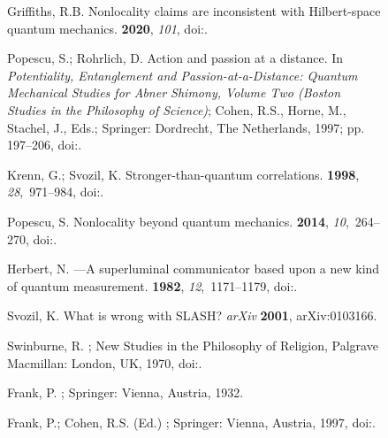\documentclass[entropy,article,accept,oneauthor,pdftex]{Definitions/mdpi}
\begin{document}
\begin{figure}[H]
\begin{thebibliography}{999}
Griffiths, R.B.
\newblock Nonlocality claims are inconsistent with {H}ilbert-space quantum
  mechanics.
 {\bf 2020}, {\em 101}, doi:{\href{https://doi.org/10.1103/physreva.101.022117}{}}.

Popescu, S.; Rohrlich, D.
\newblock Action and passion at a distance. In {\em Potentiality, Entanglement
  and Passion-at-a-Distance: Quantum Mechanical Studies for {A}bner {S}himony,
  {V}olume Two ({B}oston Studies in the Philosophy of Science)}; Cohen, R.S.,
  Horne, M., Stachel, J., Eds.; Springer: Dordrecht, The Netherlands, 1997; pp. 197--206, doi:{\href{https://doi.org/10.1007/978-94-017-2732-7\_15}{}}.

Krenn, G.; Svozil, K.
\newblock Stronger-than-quantum correlations.
 {\bf 1998}, {\em 28},~971--984, doi:{\href{https://doi.org/10.1023/A:1018821314465}{}}.

Popescu, S.
\newblock Nonlocality beyond quantum mechanics.
 {\bf 2014}, {\em 10},~264--270, doi:{\href{https://doi.org/10.1038/nphys2916}{}}.

Herbert, N.
---{A} superluminal communicator based upon a new kind of
  quantum measurement.
 {\bf 1982}, {\em 12},~1171--1179, doi:{\href{https://doi.org/10.1007/BF00729622}{}}.

Svozil, K.
\newblock What is wrong with {SLASH}? \emph{arXiv} \textbf{2001}, arXiv:0103166.

Swinburne, R.
; New Studies in the Philosophy of
  Religion, Palgrave Macmillan: London, UK, 1970, doi:{\href{https://doi.org/10.1007/978-1-349-00776-9}{}}.

Frank, P.
; Springer: Vienna, Austria, 1932.

Frank, P.; {Cohen, R.S. (Ed.)}
;
  Springer: Vienna, Austria, 1997, doi:{\href{https://doi.org/10.1007/978-94-011-5516-8}{}}.


\end{thebibliography}
\end{figure}
\end{document}
